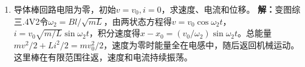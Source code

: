 \documentclass[UTF8,fontset=fandol,a4paper,11pt]{ctexart}
\begin{document}
\begin{enumerate}
\item 导体棒回路电阻为零，初始$v=v_0,i=0$，求速度、电流和位移。
\textbf{解：}变图综三.4V2令$\omega_2=Bl/\sqrt{mL}$，由两状态方程得$v=v_0\cos\omega_2t$，$i=v_0\sqrt{m/L}\sin\omega_2t$，积分速度得$x-x_0=(v_0/\omega_2)\sin\omega_2t$。总能量$mv^2/2+Li^2/2=mv_0^2/2$，速度为零时能量全在电感中，随后返回机械运动。这里棒在有限范围往返，速度和电流持续振荡。
\begin{center}\begin{minipage}{.98\linewidth}\centering
{}
\end{minipage}
\end{center}
\end{enumerate}
\end{document}
